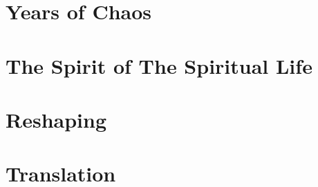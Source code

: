 \documentclass[
  final,
  babelLanguage=british,
]{anecdote}
\begin{document}






\part{Years of Chaos}








\part{The Spirit of The Spiritual Life}











\part{Reshaping}










\part{Translation}








\end{document}
